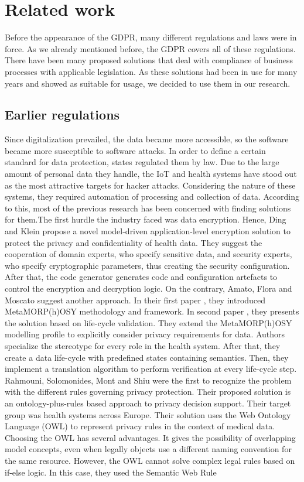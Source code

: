 \documentclass[11pt,english]{article}
\begin{document}
\section{Related work}
Before the appearance of the GDPR, many different regulations and laws were in force. As we already mentioned before, the GDPR covers all of these regulations.  There have been many proposed solutions that deal with compliance of business processes with applicable legislation. As these solutions had been in use for many years and showed as suitable for usage, we decided to use them in our research.
\subsection{Earlier regulations}
Since digitalization prevailed, the data became more accessible, so the software became more susceptible to software attacks. In order to define a certain standard for data protection, states regulated them by law. Due to the large amount of personal data they handle, the IoT \cite{iot} and health systems have stood out as the most attractive targets for hacker attacks. Considering the nature of these systems, they required automation of processing and collection of data.  According to this, most of the previous research has been concerned with finding solutions for them.\newline The first hurdle the industry faced was data encryption. Hence, Ding and Klein \cite{encryptionLevel} propose a novel model-driven application-level encryption solution to protect the privacy and confidentiality of health data. They suggest the cooperation of domain experts, who specify sensitive data, and security experts, who specify cryptographic parameters, thus creating the security configuration. After that, the code generator generates code and configuration artefacts to control the encryption and decryption logic. On the contrary, Amato, Flora and Moscato suggest another approach. In their first paper \cite{6245777}, they introduced MetaMORP(h)OSY methodology and framework. In second paper \cite{amato2015model}, they presents the solution based on life-cycle validation. They extend the MetaMORP(h)OSY modelling profile to explicitly consider privacy requirements for data. Authors specialize the stereotype for every role in the health system. After that, they create a data life-cycle with predefined states containing semantics. Then, they implement a translation algorithm to perform verification at every life-cycle step. \newline Rahmouni, Solomonides, Mont and Shiu \cite{rahmouni2011model} were the first to recognize the problem with the different rules governing privacy protection. Their proposed solution is an ontology-plus-rules based approach to privacy decision support. Their target group was health systems across Europe. Their solution uses the Web Ontology Language (OWL) \cite{owl} to represent privacy rules in the context of medical data. Choosing the OWL has several advantages. It gives the possibility of overlapping model concepts, even when legally objects use a different naming convention for the same resource. However, the OWL cannot solve complex legal rules based on if-else logic. In this case, they used the Semantic Web Rule 
\end{document}
